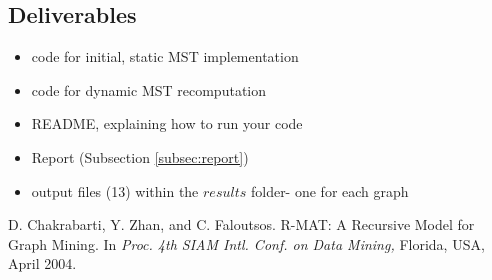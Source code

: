 \documentclass{article}
\begin{document}
\subsection{Deliverables}\label{subsec:deliv}
\begin{itemize}
\item code for initial, static MST implementation
\item code for dynamic MST recomputation
\item README, explaining how to run your code
\item Report (Subsection \ref{subsec:report})
\item output files (13) within the $results$ folder- one for each graph
\end{itemize}


\begin{thebibliography}{100}
   D. Chakrabarti, Y. Zhan, and C. Faloutsos. R-MAT: A Recursive Model for Graph Mining. In \emph{Proc. 4th SIAM Intl. Conf. on Data Mining,} Florida, USA, April 2004.



\end{thebibliography}
\end{document}
